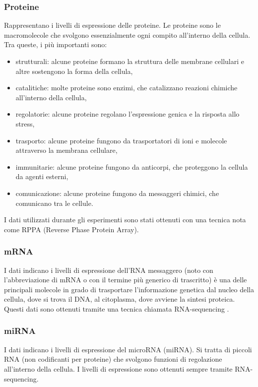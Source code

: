 \documentclass[12pt,italian]{report}
\begin{document}
	\subsubsection{Proteine}
	Rappresentano i livelli di espressione delle proteine. Le proteine sono le macromolecole che svolgono essenzialmente ogni compito all'interno della cellula. Tra queste, i più importanti sono:
	\begin{itemize}
		\item strutturali: alcune proteine formano la struttura delle membrane cellulari e altre sostengono la forma della cellula,
		\item catalitiche: molte proteine sono enzimi, che catalizzano reazioni chimiche all'interno della cellula,
		\item regolatorie: alcune proteine regolano l'espressione genica e la risposta allo stress,
		\item trasporto: alcune proteine fungono da trasportatori di ioni e molecole attraverso la membrana cellulare,
		\item immunitarie: alcune proteine fungono da anticorpi, che proteggono la cellula da agenti esterni,
		\item comunicazione: alcune proteine fungono da messaggeri chimici, che comunicano tra le cellule.
	\end{itemize}
	I dati utilizzati durante gli esperimenti sono stati ottenuti con una tecnica nota come RPPA \cite{Coarfa2021-eh} (Reverse Phase Protein Array).
	
	\subsubsection{mRNA}
	I dati indicano i livelli di espressione dell'RNA messaggero (noto con l'abbreviazione di mRNA o con il termine più generico di trascritto) è una delle principali molecole in grado di trasportare l'informazione genetica dal nucleo della cellula, dove si trova il DNA, al citoplasma, dove avviene la sintesi proteica. Questi dati sono ottenuti tramite una tecnica chiamata RNA-sequencing \cite{Wang2009-wi}. 
	
	\subsubsection{miRNA}
	I dati indicano i livelli di espressione del microRNA (miRNA). Si tratta di piccoli RNA (non codificanti per proteine) che svolgono funzioni di regolazione all'interno della cellula. I livelli di espressione sono ottenuti sempre tramite RNA-sequencing.
	
\end{document}
